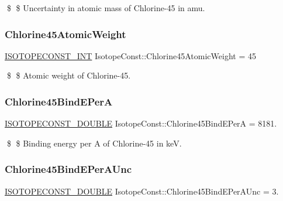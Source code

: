 \$ \$ Uncertainty in atomic mass of Chlorine-\/45 in amu. \mbox{\label{group___isotope_const-_chlorine-_cl45_gad8c7255a219897f793c7f5173af91d8c}} 
\subsubsection{\texorpdfstring{Chlorine45\+Atomic\+Weight}{Chlorine45AtomicWeight}}
{\footnotesize\ttfamily \mbox{\hyperlink{group___isotope_const-_macros_ga5f18360b3e99483a35c32d789e62621c}{I\+S\+O\+T\+O\+P\+E\+C\+O\+N\+S\+T\+\_\+\+I\+NT}} Isotope\+Const\+::\+Chlorine45\+Atomic\+Weight = 45}

\$ \$ Atomic weight of Chlorine-\/45. \mbox{\label{group___isotope_const-_chlorine-_cl45_ga183d4d32e0e580221024efd0f85fad0b}} 
\subsubsection{\texorpdfstring{Chlorine45\+Bind\+E\+PerA}{Chlorine45BindEPerA}}
{\footnotesize\ttfamily \mbox{\hyperlink{group___isotope_const-_macros_ga8f45a7272ce02c0b4c65c44636ed719a}{I\+S\+O\+T\+O\+P\+E\+C\+O\+N\+S\+T\+\_\+\+D\+O\+U\+B\+LE}} Isotope\+Const\+::\+Chlorine45\+Bind\+E\+PerA = 8181.}

\$ \$ Binding energy per A of Chlorine-\/45 in keV. \mbox{\label{group___isotope_const-_chlorine-_cl45_ga8e610c13ecfb9821f3c046aa076f1e09}} 
\subsubsection{\texorpdfstring{Chlorine45\+Bind\+E\+Per\+A\+Unc}{Chlorine45BindEPerAUnc}}
{\footnotesize\ttfamily \mbox{\hyperlink{group___isotope_const-_macros_ga8f45a7272ce02c0b4c65c44636ed719a}{I\+S\+O\+T\+O\+P\+E\+C\+O\+N\+S\+T\+\_\+\+D\+O\+U\+B\+LE}} Isotope\+Const\+::\+Chlorine45\+Bind\+E\+Per\+A\+Unc = 3.}

